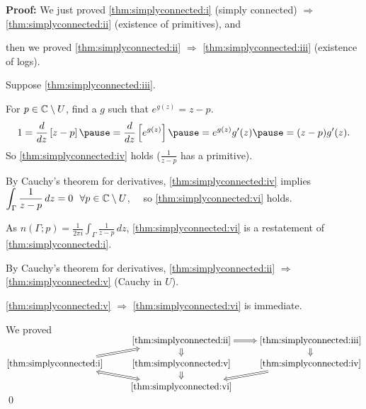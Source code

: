 \documentclass[10pt,aspectratio=169]{beamer}
\begin{document}
\begin{frame}[fragile]

\textbf{Proof:}
We just proved
\eqref{thm:simplyconnected:i} (simply connected) $\Rightarrow$
\eqref{thm:simplyconnected:ii} (existence of primitives),
and

\pause
then we proved \eqref{thm:simplyconnected:ii} $\Rightarrow$ \eqref{thm:simplyconnected:iii}
(existence of logs).

\medskip
\pause

Suppose \eqref{thm:simplyconnected:iii}. \pause

For $p \in {\mathbb{C}} \setminus U$, find a $g$ such that
$e^{g(z)} = z-p$.\pause
\[
1 = 
\frac{d}{dz} \left[
z-p
\right]
\pause
=
\frac{d}{dz} \left[
e^{g(z)}
\right]
\pause
=
e^{g(z)} g'(z)
\pause
=
(z-p) g'(z) .
\]
\pause
So \eqref{thm:simplyconnected:iv} holds ($\frac{1}{z-p}$ has a primitive).

\pause

By Cauchy's theorem for derivatives,
\eqref{thm:simplyconnected:iv} implies
$\displaystyle
\int_\Gamma \frac{1}{z-p} \, dz = 0 
\ \  \forall p \in {\mathbb{C}} \setminus U$,
\pause \ \ so \eqref{thm:simplyconnected:vi} holds.

\pause

As 
$\displaystyle
n(\Gamma;p) = 
\frac{1}{2\pi i}
\int_\Gamma \frac{1}{z-p} \, dz$,
\eqref{thm:simplyconnected:vi} is a restatement of
\eqref{thm:simplyconnected:i}.

\medskip
\pause

By Cauchy's theorem for derivatives,
\eqref{thm:simplyconnected:ii} $\Rightarrow$
\eqref{thm:simplyconnected:v} (Cauchy in $U$).

\medskip
\pause

\eqref{thm:simplyconnected:v} $\Rightarrow$ \eqref{thm:simplyconnected:vi} is immediate.

\pause
\medskip

We proved
$
\begin{tikzcd}[cramped, row sep=small]
& \text{\eqref{thm:simplyconnected:ii}} \arrow[d, Rightarrow] \arrow[r, Rightarrow] &
\text{\eqref{thm:simplyconnected:iii}} \arrow[d, Rightarrow] \\
\text{\eqref{thm:simplyconnected:i}} \arrow[ur, Rightarrow] & 
\text{\eqref{thm:simplyconnected:v}} \arrow[d, Rightarrow] &
\text{\eqref{thm:simplyconnected:iv}} \arrow[dl, Rightarrow] \\
& \text{\eqref{thm:simplyconnected:vi}} \arrow[ul, Leftrightarrow] &
\end{tikzcd}
$
\qed

\end{frame}
\end{document}
